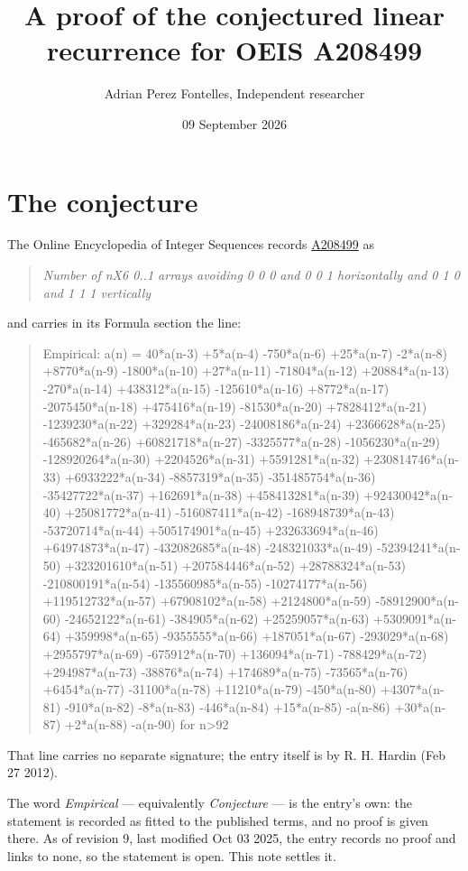 \documentclass[11pt]{article}
\title{A proof of the conjectured linear recurrence for OEIS A208499}
\author{Adrian Perez Fontelles, Independent researcher}
\date{09 September 2026}
\theoremstyle{definition}
\begin{document}
\maketitle
\section{The conjecture}

The Online Encyclopedia of Integer Sequences records \href{https://oeis.org/A208499}{A208499} as

\begin{quote}\itshape Number of nX6 0..1 arrays avoiding 0 0 0 and 0 0 1 horizontally and 0 1 0 and 1 1 1 vertically\end{quote}

and carries in its Formula section the line:

\begin{quote}\ttfamily Empirical: a(n) = 40*a(n-3) +5*a(n-4) -750*a(n-6) +25*a(n-7) -2*a(n-8) +8770*a(n-9) -1800*a(n-10) +27*a(n-11) -71804*a(n-12) +20884*a(n-13) -270*a(n-14) +438312*a(n-15) -125610*a(n-16) +8772*a(n-17) -2075450*a(n-18) +475416*a(n-19) -81530*a(n-20) +7828412*a(n-21) -1239230*a(n-22) +329284*a(n-23) -24008186*a(n-24) +2366628*a(n-25) -465682*a(n-26) +60821718*a(n-27) -3325577*a(n-28) -1056230*a(n-29) -128920264*a(n-30) +2204526*a(n-31) +5591281*a(n-32) +230814746*a(n-33) +6933222*a(n-34) -8857319*a(n-35) -351485754*a(n-36) -35427722*a(n-37) +162691*a(n-38) +458413281*a(n-39) +92430042*a(n-40) +25081772*a(n-41) -516087411*a(n-42) -168948739*a(n-43) -53720714*a(n-44) +505174901*a(n-45) +232633694*a(n-46) +64974873*a(n-47) -432082685*a(n-48) -248321033*a(n-49) -52394241*a(n-50) +323201610*a(n-51) +207584446*a(n-52) +28788324*a(n-53) -210800191*a(n-54) -135560985*a(n-55) -10274177*a(n-56) +119512732*a(n-57) +67908102*a(n-58) +2124800*a(n-59) -58912900*a(n-60) -24652122*a(n-61) -384905*a(n-62) +25259057*a(n-63) +5309091*a(n-64) +359998*a(n-65) -9355555*a(n-66) +187051*a(n-67) -293029*a(n-68) +2955797*a(n-69) -675912*a(n-70) +136094*a(n-71) -788429*a(n-72) +294987*a(n-73) -38876*a(n-74) +174689*a(n-75) -73565*a(n-76) +6454*a(n-77) -31100*a(n-78) +11210*a(n-79) -450*a(n-80) +4307*a(n-81) -910*a(n-82) -8*a(n-83) -446*a(n-84) +15*a(n-85) -a(n-86) +30*a(n-87) +2*a(n-88) -a(n-90) for n>92\end{quote}

That line carries no separate signature; the entry itself is by R. H. Hardin (Feb 27 2012).

The word {\itshape Empirical} --- equivalently {\itshape Conjecture} --- is the entry's own: the statement is recorded as fitted to the published terms, and no proof is given there. As of revision 9, last modified Oct 03 2025, the entry records no proof and links to none, so the statement is open. This note settles it.
\end{document}
